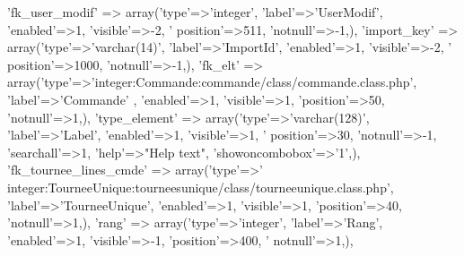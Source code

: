 \begin{DoxyCode}
        \textcolor{stringliteral}{'fk\_user\_modif'} => array(\textcolor{stringliteral}{'type'}=>\textcolor{stringliteral}{'integer'}, \textcolor{stringliteral}{'label'}=>\textcolor{stringliteral}{'UserModif'}, \textcolor{stringliteral}{'enabled'}=>1, \textcolor{stringliteral}{'visible'}=>-2, \textcolor{stringliteral}{'
      position'}=>511, \textcolor{stringliteral}{'notnull'}=>-1,),
        \textcolor{stringliteral}{'import\_key'} => array(\textcolor{stringliteral}{'type'}=>\textcolor{stringliteral}{'varchar(14)'}, \textcolor{stringliteral}{'label'}=>\textcolor{stringliteral}{'ImportId'}, \textcolor{stringliteral}{'enabled'}=>1, \textcolor{stringliteral}{'visible'}=>-2, \textcolor{stringliteral}{'
      position'}=>1000, \textcolor{stringliteral}{'notnull'}=>-1,),
        \textcolor{stringliteral}{'fk\_elt'} => array(\textcolor{stringliteral}{'type'}=>\textcolor{stringliteral}{'integer:Commande:commande/class/commande.class.php'}, \textcolor{stringliteral}{'label'}=>\textcolor{stringliteral}{'Commande'}
      , \textcolor{stringliteral}{'enabled'}=>1, \textcolor{stringliteral}{'visible'}=>1, \textcolor{stringliteral}{'position'}=>50, \textcolor{stringliteral}{'notnull'}=>1,),
        \textcolor{stringliteral}{'type\_element'} => array(\textcolor{stringliteral}{'type'}=>\textcolor{stringliteral}{'varchar(128)'}, \textcolor{stringliteral}{'label'}=>\textcolor{stringliteral}{'Label'}, \textcolor{stringliteral}{'enabled'}=>1, \textcolor{stringliteral}{'visible'}=>1, \textcolor{stringliteral}{'
      position'}=>30, \textcolor{stringliteral}{'notnull'}=>-1, \textcolor{stringliteral}{'searchall'}=>1, \textcolor{stringliteral}{'help'}=>\textcolor{stringliteral}{"Help text"}, \textcolor{stringliteral}{'showoncombobox'}=>\textcolor{charliteral}{'1'},),
        \textcolor{stringliteral}{'fk\_tournee\_lines\_cmde'} => array(\textcolor{stringliteral}{'type'}=>\textcolor{stringliteral}{'
      integer:TourneeUnique:tourneesunique/class/tourneeunique.class.php'}, \textcolor{stringliteral}{'label'}=>\textcolor{stringliteral}{'TourneeUnique'}, \textcolor{stringliteral}{'enabled'}=>1, \textcolor{stringliteral}{'visible'}=>1, \textcolor{stringliteral}{'position'}=>40, \textcolor{stringliteral}{'notnull'}=>1,),
        \textcolor{stringliteral}{'rang'} => array(\textcolor{stringliteral}{'type'}=>\textcolor{stringliteral}{'integer'}, \textcolor{stringliteral}{'label'}=>\textcolor{stringliteral}{'Rang'}, \textcolor{stringliteral}{'enabled'}=>1, \textcolor{stringliteral}{'visible'}=>-1, \textcolor{stringliteral}{'position'}=>400, \textcolor{stringliteral}{'
      notnull'}=>1,),

\end{DoxyCode}
